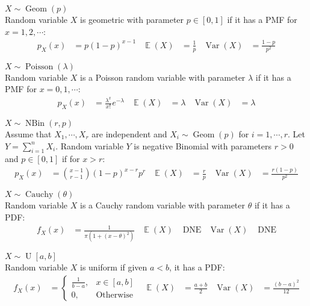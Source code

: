 \documentclass{huhtakm-template-book-v2}
\DeclareMathOperator{\E}{\mathbb{E}}
\DeclareMathOperator{\Var}{Var}
\DeclareMathOperator{\Geom}{Geom}
\DeclareMathOperator{\Poisson}{Poisson}
\DeclareMathOperator{\Cauchy}{Cauchy}
\DeclareMathOperator{\NBin}{NBin}
\DeclareMathOperator{\U}{U}
\begin{document}
\newpage
\begin{eg} $X\sim\Geom(p)$\\
	Random variable $X$ is geometric with parameter $p\in[0,1]$ if it has a PMF for $x=1,2,\cdots$:
	\begin{align*}
		p_{X}(x)&=p(1-p)^{x-1} & \E(X)&=\frac{1}{p} & \Var(X)&=\frac{1-p}{p^{2}}
	\end{align*}
\end{eg}
\begin{eg} $X\sim\Poisson(\lambda)$\\
	Random variable $X$ is a Poisson random variable with parameter $\lambda$ if it has a PMF for $x=0,1,\cdots$:
	\begin{align*}
		p_{X}(x)&=\frac{\lambda^{x}}{x!}e^{-\lambda} & \E(X)&=\lambda & \Var(X)&=\lambda
	\end{align*}
\end{eg}
\begin{eg} $X\sim\NBin(r,p)$\\
	Assume that $X_{1},\cdots,X_{r}$ are independent and $X_{i}\sim\Geom(p)$ for $i=1,\cdots,r$. Let $Y=\sum_{i=1}^{n}X_{i}$. Random variable $Y$ is negative Binomial with parameters $r>0$ and $p\in[0,1]$ if for $x>r$:
	\begin{align*}
		p_{X}(x)&=\binom{x-1}{r-1}(1-p)^{x-r}p^{r} & \E(X)&=\frac{r}{p} & \Var(X)&=\frac{r(1-p)}{p^{2}}
	\end{align*}
\end{eg}
\begin{eg} $X\sim\Cauchy(\theta)$\\
	Random variable $X$ is a Cauchy random variable with parameter $\theta$ if it has a PDF:
	\begin{align*}
		f_{X}(x)&=\frac{1}{\pi(1+(x-\theta)^{2})} & \E(X)&\text{ DNE} & \Var(X)&\text{ DNE}
	\end{align*}
\end{eg}
\begin{eg} $X\sim\U[a,b]$\\
	Random variable $X$ is uniform if given $a<b$, it has a PDF:
	\begin{align*}
		f_{X}(x)&=\begin{cases}
			\frac{1}{b-a}, &x\in[a,b]\\
			0, &\text{Otherwise}
		\end{cases} & \E(X)&=\frac{a+b}{2} & \Var(X)&=\frac{(b-a)^{2}}{12}
	\end{align*}
\end{eg}
\end{document}
